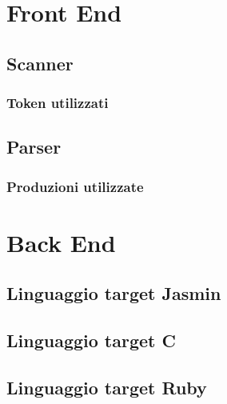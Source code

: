 \documentclass[11pt, a4paper, twoside, notitlepage]{report}
\begin{document}
\thispagestyle{empty} %
\clearpage

\begin{abstract}

\begin{flushright}
{\bf Keywords:} Jasmin, Compilatori, Cup, JFlex
\end{flushright}

\end{abstract}

\onehalfspacing

\setcounter{page}{1}
\setcounter{tocdepth}{3}%
\tableofcontents

\chapter{Front End}

\section{Scanner}
\subsection{Token utilizzati} 
\section{Parser}
\subsection{Produzioni utilizzate}

\chapter{Back End}
\section{Linguaggio target Jasmin}
\section{Linguaggio target C}
\section{Linguaggio target Ruby}
\end{document}
